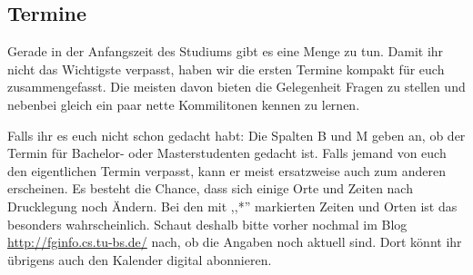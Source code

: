 \subsection{Termine}
\label{termine}
	\begin{multicols}{2}
	Gerade in der Anfangszeit des Studiums gibt es eine Menge zu tun. Damit ihr
	nicht das Wichtigste verpasst, haben wir die ersten Termine kompakt für
	euch zusammengefasst. Die meisten davon bieten die Gelegenheit Fragen zu
	stellen und nebenbei gleich ein paar nette Kommilitonen kennen zu lernen.

	Falls ihr es euch nicht schon gedacht habt: Die Spalten B und M geben an,
	ob der Termin für Bachelor- oder Masterstudenten gedacht ist. Falls jemand
	von euch den eigentlichen Termin verpasst, kann er meist ersatzweise auch
	zum anderen erscheinen. Es besteht die Chance, dass sich einige Orte
	und Zeiten
	nach Drucklegung noch Ändern.  Bei den mit ,,*'' markierten Zeiten und
	Orten ist das besonders wahrscheinlich. Schaut deshalb bitte vorher
	nochmal im Blog \url{http://fginfo.cs.tu-bs.de/} nach, ob die Angaben
	noch aktuell sind. Dort könnt ihr übrigens auch den Kalender digital abonnieren.
	\end{multicols}

